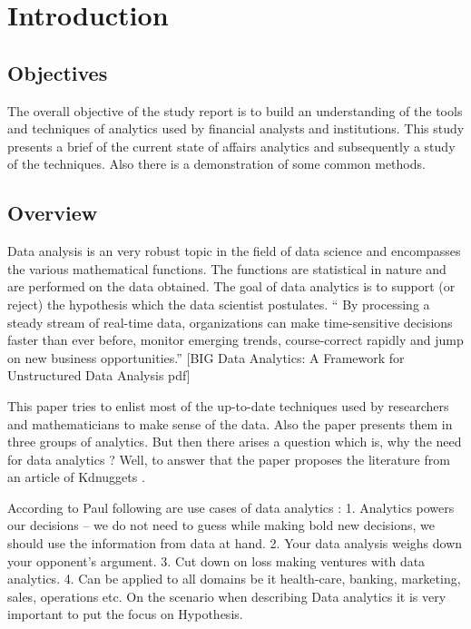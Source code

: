\setlength{\footskip}{8mm}

\chapter{Introduction}

\section{Objectives}

The overall objective of the study report is to build an understanding of the tools and techniques of analytics used by financial analysts and institutions. This study presents a brief of the current state of affairs analytics and subsequently a study of the techniques. Also there is a demonstration of some common methods.


\section{Overview}

Data analysis is an very robust topic in the field of data science and encompasses the various mathematical functions. The functions are statistical in nature and are performed on the data obtained. The goal of data analytics is to support (or reject) the hypothesis which the data scientist postulates.
“ By processing a steady stream of real-time data, organizations can make time-sensitive decisions faster than ever before, monitor emerging trends, course-correct rapidly and jump on new business opportunities.” [BIG Data Analytics: A Framework for Unstructured Data Analysis pdf]

This paper tries to enlist most of the up-to-date techniques used by researchers and mathematicians to make sense of the data. Also the paper presents them in three groups of analytics.
But then there arises a question which is, why the need for data analytics ? Well, to answer that the paper proposes the literature from an article of Kdnuggets .



According to Paul following are use cases  of data analytics :
1. Analytics powers our decisions – we do not need to guess while making bold new decisions, we should use the information from data at hand.
2. Your data analysis weighs down your opponent's argument.
3. Cut down on loss making ventures with data analytics.
4. Can be applied to all domains be it health-care, banking, marketing, sales, operations etc.
On the scenario when describing Data analytics it is very important to put the focus on Hypothesis.

